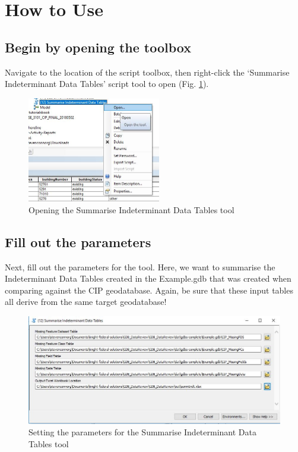 \documentclass[openany]{book}
\theoremstyle{definition}
\theoremstyle{definition}
\theoremstyle{definition}
\theoremstyle{remark}
\begin{document}
\section{How to Use}\label{how-to-use-9}

\subsection{Begin by opening the
toolbox}\label{begin-by-opening-the-toolbox-9}

Navigate to the location of the script toolbox, then right-click the
`Summarise Indeterminant Data Tables' script tool to open (Fig.
\ref{fig:summIndtopen}).

\begin{figure}[H]

{\centering \includegraphics[width=2.29in,]{figures/summIndt-open} 

}

\caption{Opening the Summarise Indeterminant Data Tables tool}\label{fig:summIndtopen}
\end{figure}

\subsection{Fill out the parameters}\label{fill-out-the-parameters-9}

Next, fill out the parameters for the tool. Here, we want to summarise
the Indeterminant Data Tables created in the Example.gdb that was
created when comparing against the CIP geodatabase. Again, be sure that
these input tables all derive from the same target geodatabase!

\begin{figure}[H]

{\centering \includegraphics[width=4.48in,]{figures/summIndt-toolparams} 

}

\caption{Setting the parameters for the Summarise Indeterminant Data Tables tool }\label{fig:summIndtparams}
\end{figure}
\end{document}
